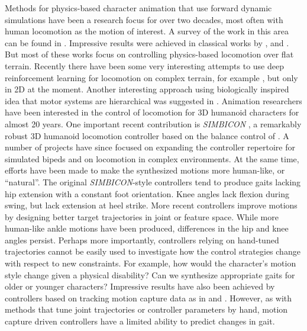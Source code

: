 
Methods for physics-based character animation that use forward dynamic
simulations have been a research focus for over two decades, most often with
human locomotion as the motion of interest. A survey of the work in this area
can be found in \cite{geijtenbeek2012interactive}. Impressive results were
achieved in classical works by \cite{coros2011locomotion},
\cite{wang2012optimizing} and \cite{geijtenbeek2013flexible}. But most of these
works focus on controlling physics-based locomotion over flat terrain. Recently
there have been some very interesting attempts to use deep reinforcement
learning for locomotion on complex terrain, for example \cite{peng2016terrain},
but only in 2D at the moment. Another interesting approach using biologically
inspired idea that motor systems are hierarchical was suggested in
\cite{geijtenbeek2012interactive}. Animation researchers have been interested
in the control of locomotion for 3D humanoid characters for almost 20 years.
One important recent contribution is \emph{SIMBICON} \cite{yin2007simbicon}, a
remarkably robust 3D humanoid locomotion controller based on the balance
control of \cite{raibert1991animation}. A number of projects have since focused
on expanding the controller repertoire for simulated bipeds and on locomotion
in complex environments. At the same time, efforts have been made to make the
synthesized motions more human-like, or ``natural''. The original
\emph{SIMBICON}-style controllers tend to produce gaits lacking hip extension
with a constant foot orientation. Knee angles lack flexion during swing, but
lack extension at heel strike. More recent controllers improve motions by
designing better target trajectories in joint or feature space. While more
human-like ankle motions have been produced, differences in the hip and knee
angles persist. Perhaps more importantly, controllers relying on hand-tuned
trajectories cannot be easily used to investigate how the control strategies
change with respect to new constraints. For example, how would the character's
motion style change given a physical disability? Can we synthesize appropriate
gaits for older or younger characters? Impressive results have also been
achieved by controllers based on tracking motion capture data as in
\cite{da2008interactive} and \cite{ye2010optimal}. However, as with methods
that tune joint trajectories or controller parameters by hand, motion capture
driven controllers have a limited ability to predict changes in gait.
